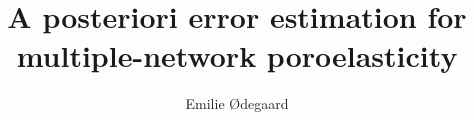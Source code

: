 \documentclass[a4paper, 11.5pt]{memoir}
\title{A posteriori error estimation for multiple-network poroelasticity}
\author{Emilie Ødegaard}
\begin{document}
	\masterfrontpage
    \frontmatter        %
	
	
	
    \tableofcontents    %

    \mainmatter         %

	
	
	
	
	
	

    \backmatter         %
    \printbibliography
\end{document}
